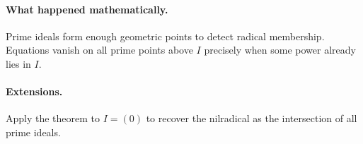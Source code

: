 \paragraph{What happened mathematically.}
Prime ideals form enough geometric points to detect radical membership.  Equations vanish
on all prime points above \(I\) precisely when some power already lies in \(I\).

\paragraph{Extensions.}
Apply the theorem to \(I=(0)\) to recover the nilradical as the intersection of all prime
ideals.
\fi
